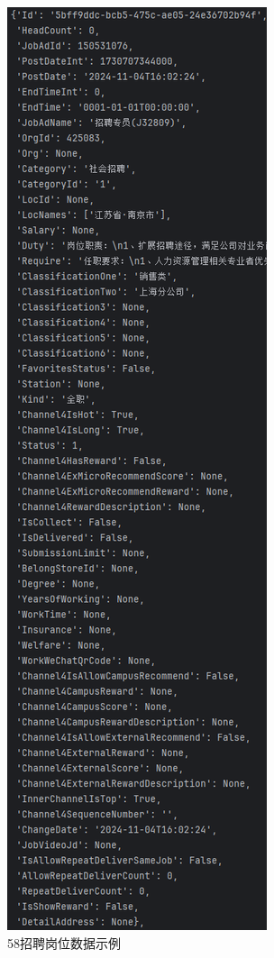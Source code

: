 \begin{figure}[!htbp]
    \centering
    \includegraphics[height=0.8\textheight]{figures/data.png}
    \caption{58招聘岗位数据示例}\label{data}
\end{figure}


